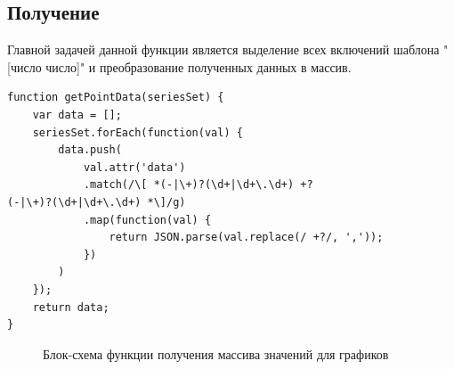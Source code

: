 \documentclass[a4paper,14pt]{extreport}
\begin{document}
\subsection{Получение}
\hspace{4ex}Главной задачей данной функции является выделение всех включений шаблона "[число число]" и преобразование полученных данных в массив.
\begin{verbatim}
function getPointData(seriesSet) {
    var data = [];
    seriesSet.forEach(function(val) {
        data.push(
            val.attr('data')
            .match(/\[ *(-|\+)?(\d+|\d+\.\d+) +?
(-|\+)?(\d+|\d+\.\d+) *\]/g)
            .map(function(val) {
                return JSON.parse(val.replace(/ +?/, ','));
            })
        )
    });
    return data;
}
\end{verbatim}
\begin{figure}[h]
\caption{Блок-схема функции получения массива значений для графиков}
\label{ris:image}
\end{figure}
\end{document}
